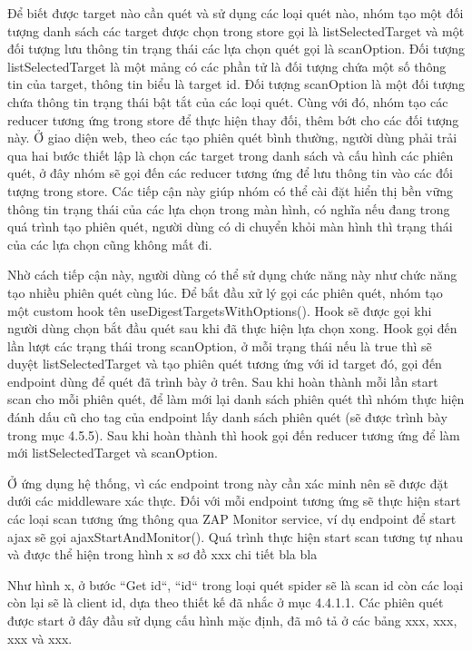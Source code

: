 Để biết được target nào cần quét và sử dụng các loại quét nào, nhóm tạo một đối tượng danh sách các target được chọn trong store gọi là listSelectedTarget và một đối tượng lưu thông tin trạng thái các lựa chọn quét gọi là scanOption. Đối tượng listSelectedTarget là một mảng có các phần tử là đối tượng chứa một số thông tin của target, thông tin biểu là target id. Đối tượng scanOption là một đối tượng chứa thông tin trạng thái bật tắt của các loại quét. Cùng với đó, nhóm tạo các reducer tương ứng trong store để thực hiện thay đối, thêm bớt cho các đối tượng này. Ở giao diện web, theo các tạo phiên quét bình thường, người dùng phải trải qua hai bước thiết lập là chọn các target trong danh sách và cấu hình các phiên quét, ở đây nhóm sẽ gọi đến các reducer tương ứng để lưu thông tin vào các đối tượng trong store. Các tiếp cận này giúp nhóm có thể cài đặt hiển thị bền vững thông tin trạng thái của các lựa chọn trong màn hình, có nghĩa nếu đang trong quá trình tạo phiên quét, người dùng có di chuyển khỏi màn hình thì trạng thái của các lựa chọn cũng không mất đi.

Nhờ cách tiếp cận này, người dùng có thể sử dụng chức năng này như chức năng tạo nhiều phiên quét cùng lúc. Để bắt đầu xử lý gọi các phiên quét, nhóm tạo một custom hook tên useDigestTargetsWithOptions(). Hook sẽ được gọi khi người dùng chọn bắt đầu quét sau khi đã thực hiện lựa chọn xong. Hook gọi đến lần lượt các trạng thái trong scanOption, ở mỗi trạng thái nếu là true thì sẽ duyệt listSelectedTarget và tạo phiên quét tương ứng với id target đó, gọi đến endpoint dùng để quét đã trình bày ở trên. Sau khi hoàn thành mỗi lần start scan cho mỗi phiên quét, để làm mới lại danh sách phiên quét thì nhóm thực hiện đánh dấu cũ cho tag của endpoint lấy danh sách phiên quét (sẽ được trình bày trong mục 4.5.5). Sau khi hoàn thành thì hook gọi đến reducer tương ứng để làm mới listSelectedTarget và scanOption.

 Ở ứng dụng hệ thống, vì các endpoint trong này cần xác minh nên sẽ được đặt dưới các middleware xác thực. Đối với mỗi endpoint tương ứng sẽ thực hiện start các loại scan tương ứng thông qua ZAP Monitor service, ví dụ endpoint để start ajax sẽ gọi ajaxStartAndMonitor(). Quá trình thực hiện start scan tương tự nhau và được thể hiện trong hình x sơ đồ xxx chi tiết bla bla


Như hình x, ở bước “Get id“, “id“ trong loại quét spider sẽ là scan id còn các loại còn lại sẽ là client id, dựa theo thiết kế đã nhắc ở mục 4.4.1.1. Các phiên quét được start ở đây đầu sử dụng cấu hình mặc định, đã mô tả ở các bảng xxx, xxx, xxx và xxx.

